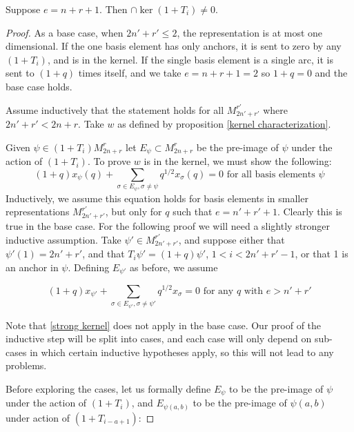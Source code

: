 \documentclass{amsart}
\begin{document}
\vspace{5mm}
\begin{theorem}
	Suppose $e=n+r+1$. Then $\cap\ker(1+T_i)\not=0$.
	\label{kernel existence}
\end{theorem}

\begin{proof}
	
	
	As a base case, when $2n'+r'\leq 2$, the representation is at most one dimensional. If the one basis element has only anchors, it is sent to zero by any $(1+T_i)$, and is in the kernel. If the single basis element is a single arc, it is sent to $(1+q)$ times itself, and we take $e=n+r+1=2$ so $1+q=0$ and the base case holds.
	
	\vspace{5mm}
	
	Assume inductively that the statement holds for all $M_{2n'+r'}^{r'}$ where $2n'+r'<2n+r$. Take $w$ as defined by proposition \ref{kernel characterization}.
	
	Given $\psi\in (1+T_i)M_{2n+r}^r$ let $E_\psi\subset M_{2n+r}^r$ be the pre-image of $\psi$ under the action of $(1+T_i)$. To prove $w$ is in the kernel, we must show the following: 
	\begin{equation}
	(1+q)x_\psi(q)+\sum_{\sigma\in E_\psi,\sigma\not=\psi}q^{1/2}x_\sigma(q)=0\text{ for all basis elements }\psi
	\label{weak kernel}
	\end{equation}
	Inductively, we assume this equation holds for basis elements in smaller representations $M_{2n'+r'}^{r'}$, but only for $q$ such that $e=n'+r'+1$. Clearly this is true in the base case. For the following proof we will need a slightly stronger inductive assumption. Take $\psi'\in M_{2n'+r'}^{r'}$, and suppose either that $\psi'(1)=2n'+r'$, and that $T_i\psi'=(1+q)\psi'$, $1<i<2n'+r'-1$, or that 1 is an anchor in $\psi$. Defining $E_{\psi'}$ as before, we assume
	
	\begin{equation}
	(1+q)x_{\psi'}+\sum_{\sigma\in E_{\psi'},\sigma\not=\psi'}q^{1/2}x_\sigma=0\text{ for any } q \text{ with }e>n'+r'
	\label{strong kernel}
	\end{equation}
	
	Note that \ref{strong kernel} does not apply in the base case. Our proof of the inductive step will be split into cases, and each case will only depend on sub-cases in which certain inductive hypotheses apply, so this will not lead to any problems.
	
	Before exploring the cases, let us formally define $E_\psi$ to be the pre-image of $\psi$ under the action of $(1+T_i)$, and $E_{\psi(a,b)}$ to be the pre-image of $\psi(a,b)$ under action of $(1+T_{i-a+1})$:
	

\end{proof}
\end{document}
